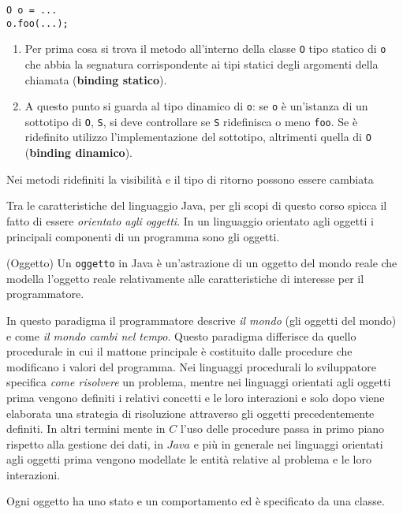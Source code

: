 \documentclass{article}
\begin{document}
\begin{lstlisting}
O o = ...
o.foo(...);
\end{lstlisting}

\begin{enumerate}
	\item Per prima cosa si trova il metodo all'interno della classe \texttt{O} tipo statico di \texttt{o} che abbia la segnatura corrispondente ai tipi statici degli argomenti della chiamata
	(\textbf{binding statico}).
	\item A questo punto si guarda al tipo dinamico di \texttt{o}: se 
	\texttt{o} è un'istanza di un sottotipo di \texttt{O}, \texttt{S}, si deve controllare
	se \texttt{S} ridefinisca o meno \texttt{foo}. Se è ridefinito utilizzo l'implementazione del
	sottotipo, altrimenti quella di \texttt{O} (\textbf{binding dinamico}).
\end{enumerate}

Nei metodi ridefiniti la visibilità e il tipo di ritorno possono essere cambiata






Tra le caratteristiche del linguaggio Java, 
per gli scopi di questo corso spicca il fatto di essere \emph{orientato agli oggetti}.
In un linguaggio orientato agli oggetti i principali componenti
di un programma sono gli oggetti.

\begin{mydef} (Oggetto) Un \texttt{oggetto} in Java è un'astrazione
	di un oggetto del mondo reale che modella l'oggetto reale
	relativamente alle caratteristiche di interesse per il programmatore.
\end{mydef}
In questo paradigma il programmatore descrive \emph{il mondo}
(gli oggetti del mondo) e come \emph{il mondo cambi nel tempo}.
Questo paradigma differisce da quello procedurale
in cui il mattone principale è costituito dalle procedure
che modificano i valori del programma.
Nei linguaggi procedurali lo sviluppatore specifica \emph{come risolvere} un problema, mentre nei linguaggi orientati agli oggetti
prima vengono definiti i relativi concetti e le loro interazioni e solo dopo viene elaborata una strategia di risoluzione attraverso
gli oggetti precedentemente definiti.
In altri termini mente in $C$ l'uso delle procedure passa in primo piano rispetto alla gestione dei dati,
in $Java$ e più in generale nei linguaggi orientati agli oggetti 
prima vengono modellate le entità relative al problema e le loro interazioni.

Ogni oggetto ha uno stato e un comportamento ed è specificato da una classe.
\end{document}
